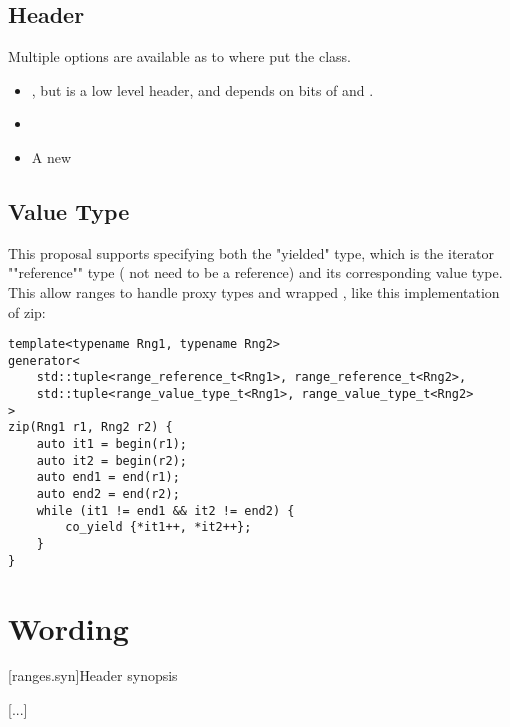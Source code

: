 \documentclass{wg21}
\begin{document}
\subsection{Header}

Multiple options are available as to where put the  class.

\begin{itemize}
\item {}, but  is a low level header, and  depends on bits of  and .

\item {}

\item A new 

\end{itemize}

\subsection{Value Type}

This proposal supports specifying both the "yielded" type, which is the iterator ""reference"" type ( not need to be a reference) and its corresponding value type.
This allow ranges to handle proxy types and wrapped , like this implementation of zip:

\begin{lstlisting}[style=color]
template<typename Rng1, typename Rng2>
generator<
    std::tuple<range_reference_t<Rng1>, range_reference_t<Rng2>,
    std::tuple<range_value_type_t<Rng1>, range_value_type_t<Rng2>
>
zip(Rng1 r1, Rng2 r2) {
    auto it1 = begin(r1);
    auto it2 = begin(r2);
    auto end1 = end(r1);
    auto end2 = end(r2);
    while (it1 != end1 && it2 != end2) {
        co_yield {*it1++, *it2++};
    }
}
\end{lstlisting}

\section{Wording}


[ranges.syn]{Header  synopsis}

[...]

\begin{codeblock}
    
namespace std {

\end{codeblock}  
\end{document}
